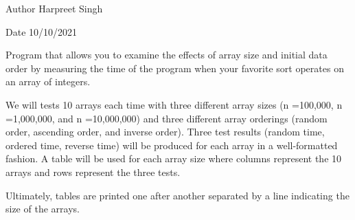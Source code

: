 \begin{DoxyAuthor}{Author}
Harpreet Singh 
\end{DoxyAuthor}
\begin{DoxyDate}{Date}
10/10/2021
\end{DoxyDate}
Program that allows you to examine the effects of array size and initial data order by measuring the time of the program when your favorite sort operates on an array of integers.

We will tests 10 arrays each time with three different array sizes (n =100,000, n =1,000,000, and n =10,000,000) and three different array orderings (random order, ascending order, and inverse order). Three test results (random time, ordered time, reverse time) will be produced for each array in a well-\/formatted fashion. A table will be used for each array size where columns represent the 10 arrays and rows represent the three tests.

Ultimately, tables are printed one after another separated by a line indicating the size of the arrays. 